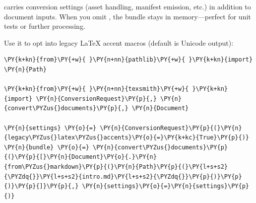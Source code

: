 \documentclass[a4paper,twoside]{article}
\begin{document}
 carries conversion settings (asset handling, manifest emission, etc.) in addition to document inputs. When you omit , the bundle stays in memory---perfect for unit tests or further processing.

Use it to opt into legacy \LaTeX{} accent macros (default is Unicode output):
\begin{tscode}[lang=python, engine=pygments]
\begin{Verbatim}[commandchars=\\\{\},breaklines, breakanywhere, commandchars=\\\{\}]
\PY{k+kn}{from}\PY{+w}{ }\PY{n+nn}{pathlib}\PY{+w}{ }\PY{k+kn}{import} \PY{n}{Path}

\PY{k+kn}{from}\PY{+w}{ }\PY{n+nn}{texsmith}\PY{+w}{ }\PY{k+kn}{import} \PY{n}{ConversionRequest}\PY{p}{,} \PY{n}{convert\PYZus{}documents}\PY{p}{,} \PY{n}{Document}

\PY{n}{settings} \PY{o}{=} \PY{n}{ConversionRequest}\PY{p}{(}\PY{n}{legacy\PYZus{}latex\PYZus{}accents}\PY{o}{=}\PY{k+kc}{True}\PY{p}{)}
\PY{n}{bundle} \PY{o}{=} \PY{n}{convert\PYZus{}documents}\PY{p}{(}\PY{p}{[}\PY{n}{Document}\PY{o}{.}\PY{n}{from\PYZus{}markdown}\PY{p}{(}\PY{n}{Path}\PY{p}{(}\PY{l+s+s2}{\PYZdq{}}\PY{l+s+s2}{intro.md}\PY{l+s+s2}{\PYZdq{}}\PY{p}{)}\PY{p}{)}\PY{p}{]}\PY{p}{,} \PY{n}{settings}\PY{o}{=}\PY{n}{settings}\PY{p}{)}
\end{Verbatim}
\end{tscode}
\end{document}
